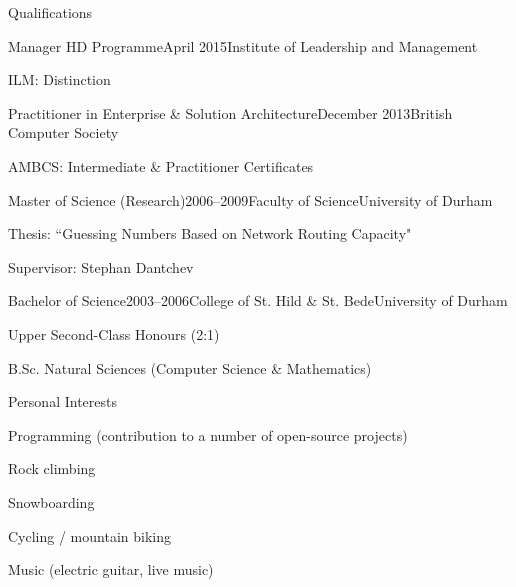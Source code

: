 \documentclass{cv}
\begin{document}
\begin{rSection}{Qualifications}

\begin{rSubsection}{Manager HD Programme}{April 2015}{Institute of Leadership and Management}{}
\item ILM: Distinction
\end{rSubsection}

\begin{rSubsection}{Practitioner in Enterprise \& Solution Architecture}{December 2013}{British Computer Society}{}
\item AMBCS: Intermediate \& Practitioner Certificates
\end{rSubsection}

\begin{rSubsection}{Master of Science (Research)}{2006--2009}{Faculty of Science}{University of Durham}
\item Thesis: ``Guessing Numbers Based on Network Routing Capacity"
\item Supervisor: Stephan Dantchev
\end{rSubsection}

\begin{rSubsection}{Bachelor of Science}{2003--2006}{College of St. Hild \& St. Bede}{University of Durham}
\item Upper Second-Class Honours (2:1)
\item B.Sc. Natural Sciences (Computer Science \& Mathematics)
\end{rSubsection}

\end{rSection}


\begin{rSection}{Personal Interests}

\begin{rSubsection}{}{}{}{}
\item Programming (contribution to a number of open-source projects)
\item Rock climbing
\item Snowboarding
\item Cycling / mountain biking
\item Music (electric guitar, live music)
\end{rSubsection}

\end{rSection}

\end{document}
